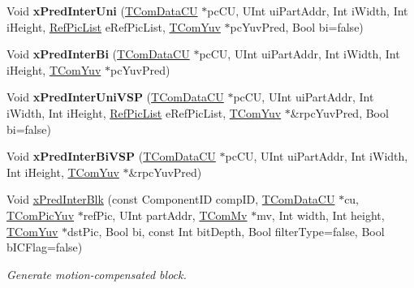 \begin{DoxyCompactItemize}
\mbox{\label{class_t_com_prediction_a7073ca519fb2598055df00fe0cf811b3}} 
Void {\bfseries x\+Pred\+Inter\+Uni} (\hyperlink{class_t_com_data_c_u}{T\+Com\+Data\+CU} $\ast$pc\+CU, U\+Int ui\+Part\+Addr, Int i\+Width, Int i\+Height, \hyperlink{_type_def_8h_a93cea48eb9dcfd661168dee82e41b384}{Ref\+Pic\+List} e\+Ref\+Pic\+List, \hyperlink{class_t_com_yuv}{T\+Com\+Yuv} $\ast$pc\+Yuv\+Pred, Bool bi=false)
\item 
\mbox{\label{class_t_com_prediction_a398e854da5cb3496ac80cb20b23b2b52}} 
Void {\bfseries x\+Pred\+Inter\+Bi} (\hyperlink{class_t_com_data_c_u}{T\+Com\+Data\+CU} $\ast$pc\+CU, U\+Int ui\+Part\+Addr, Int i\+Width, Int i\+Height, \hyperlink{class_t_com_yuv}{T\+Com\+Yuv} $\ast$pc\+Yuv\+Pred)
\item 
\mbox{\label{class_t_com_prediction_a7023a45b55a9cd75ea6e8ddf44c36089}} 
Void {\bfseries x\+Pred\+Inter\+Uni\+V\+SP} (\hyperlink{class_t_com_data_c_u}{T\+Com\+Data\+CU} $\ast$pc\+CU, U\+Int ui\+Part\+Addr, Int i\+Width, Int i\+Height, \hyperlink{_type_def_8h_a93cea48eb9dcfd661168dee82e41b384}{Ref\+Pic\+List} e\+Ref\+Pic\+List, \hyperlink{class_t_com_yuv}{T\+Com\+Yuv} $\ast$\&rpc\+Yuv\+Pred, Bool bi=false)
\item 
\mbox{\label{class_t_com_prediction_afe349a531758e12241ec9bd73a799dc3}} 
Void {\bfseries x\+Pred\+Inter\+Bi\+V\+SP} (\hyperlink{class_t_com_data_c_u}{T\+Com\+Data\+CU} $\ast$pc\+CU, U\+Int ui\+Part\+Addr, Int i\+Width, Int i\+Height, \hyperlink{class_t_com_yuv}{T\+Com\+Yuv} $\ast$\&rpc\+Yuv\+Pred)
\item 
Void \hyperlink{class_t_com_prediction_a7a9e256d00059c789e8d4502a0047a63}{x\+Pred\+Inter\+Blk} (const Component\+ID comp\+ID, \hyperlink{class_t_com_data_c_u}{T\+Com\+Data\+CU} $\ast$cu, \hyperlink{class_t_com_pic_yuv}{T\+Com\+Pic\+Yuv} $\ast$ref\+Pic, U\+Int part\+Addr, \hyperlink{class_t_com_mv}{T\+Com\+Mv} $\ast$mv, Int width, Int height, \hyperlink{class_t_com_yuv}{T\+Com\+Yuv} $\ast$dst\+Pic, Bool bi, const Int bit\+Depth, Bool filter\+Type=false, Bool b\+I\+C\+Flag=false)
\begin{DoxyCompactList}\small\item\em Generate motion-\/compensated block. \end{DoxyCompactList}\item 

\end{DoxyCompactItemize}
